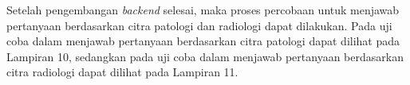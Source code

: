   \par Setelah pengembangan \textit{backend} selesai, maka proses percobaan untuk menjawab pertanyaan berdasarkan citra patologi dan radiologi dapat dilakukan. Pada uji coba dalam menjawab pertanyaan berdasarkan citra patologi dapat dilihat pada Lampiran 10, sedangkan pada uji coba dalam menjawab pertanyaan berdasarkan citra radiologi dapat dilihat pada Lampiran 11.
  

